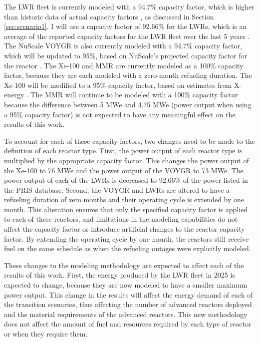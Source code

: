 The \gls{LWR} fleet is currently modeled with a 94.7\% capacity factor, 
which is higher than historic data of actual capacity factors 
\cite{us_eia_monthly_2022}, as discussed in Section \ref{sec:scenario1}.
I will use a capacity factor of 92.66\% for the \glspl{LWR}, which 
is an average of the reported capacity factors for the \gls{LWR} fleet 
over the last 5 years \cite{noauthor_electric_2022}. The NuScale VOYGR 
is also currently modeled with 
a 94.7\% capacity factor, which will be updated to 95\%, based on 
NuScale's projected capacity factor for the reactor 
\cite{nuscale_technology_nodate}. The Xe-100 and \gls{MMR} are currently 
modeled as a 100\% capacity factor, because they are each modeled with a 
zero-month refueling duration. The Xe-100 will be modified to a 95\% 
capacity factor, based on estimates from X-energy 
\cite{xenergy_reactor_nodate}. The \gls{MMR} will continue to be modeled 
with a 100\% capacity factor because the difference between 
5 MWe and 4.75 MWe (power output when using a 95\% capacity factor) is 
not expected to have any meaningful effect on the results of this work. 

To account for each of these capacity factors, two changes need to be 
made 
to the definition of each reactor type. First, the power output of each 
reactor type is multiplied by the appropriate capacity factor. This 
changes the power output of the Xe-100 to 76 MWe and the power output of 
the VOYGR to 73 MWe. The power output of each of the \glspl{LWR} is 
decreased to 92.66\% of the power listed in the \gls{PRIS} database. 
Second, the VOYGR and \glspl{LWR} are altered to have a refueling 
duration of zero months and their operating cycle is extended by one 
month. This alteration ensures that only the specified capacity factor 
is applied
to each of these reactors, and limitations in the modeling capabilities 
do not affect the capacity factor or introduce artificial changes to the 
reactor capacity factor. By extending the operating 
cycle by one month, the reactors still receive fuel on the same schedule 
as when the refueling outages were explicitly modeled. 

These changes to the modeling methodology are expected to affect each of 
the results of this work. First, the energy produced by the \gls{LWR} 
fleet in 
2025 is expected to change, because they are now modeled to have a 
smaller maximum power output. 
This change in the results will affect the energy demand of each of the 
transition scenarios, thus affecting the number of advanced reactors 
deployed and the material requirements of the advanced reactors. This 
new methodology does not affect the amount of fuel and resources required 
by each type of reactor or when they require them. 


